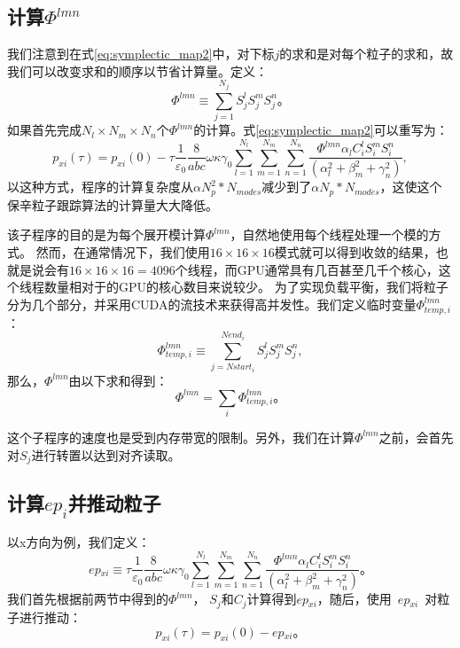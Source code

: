 \subsection{计算$\Phi^{lmn}$}\label{section:phi}
我们注意到在式\eqref{eq:symplectic_map2}中，对下标$j$的求和是对每个粒子的求和，故我们可以改变求和的顺序以节省计算量。定义：
\begin{equation}
\Phi^{lmn}\equiv \sum\limits_{j=1}^{{{N}_{j}}}{S_{j}^{l}S_{j}^{m}S_{j}^{n}}\text{。}
\end{equation}
如果首先完成${{N}_{l}}\times{{N}_{m}}\times{{N}_{n}}$个$\Phi^{lmn}$的计算。式\eqref{eq:symplectic_map2}可以重写为：
\begin{equation}\label{eq:symplectic_map3}
{{p}_{xi}}(\tau )={{p}_{xi}}(0)-\tau \frac{1}{{{\varepsilon }_{0}}}\frac{8}{abc}\omega \kappa {{\gamma }_{0}}\sum\limits_{l=1}^{{{N}_{l}}}{\sum\limits_{m=1}^{{{N}_{m}}}{\sum\limits_{n=1}^{{{N}_{n}}}{\frac{\Phi^{lmn}{{\alpha }_{l}}C_{i}^{l}S_{i}^{m}S_{i}^{n}}{(\alpha _{l}^{2}+\beta _{m}^{2}+\gamma _{n}^{2})}}}},
\end{equation}
以这种方式，程序的计算复杂度从$\alpha N_p^2*N_{modes}$减少到了$\alpha  N_p*N_{modes}$，这使这个保辛粒子跟踪算法的计算量大大降低。

该子程序的目的是为每个展开模计算$\Phi^{lmn}$，自然地使用每个线程处理一个模的方式。
然而，在通常情况下，我们使用$16\times 16\times 16$模式就可以得到收敛的结果，也就是说会有$16\times 16\times 16 = 4096$个线程，而GPU通常具有几百甚至几千个核心，这个线程数量相对于的GPU的核心数目来说较少。
为了实现负载平衡，我们将粒子分为几个部分，并采用CUDA的流技术来获得高并发性。我们定义临时变量$\Phi^{lmn}_{temp,i}$：
\begin{equation}
\Phi^{lmn}_{temp,i}\equiv \sum\limits_{j=Nstar{{t}_{i}}}^{Nen{{d}_{i}}}{S_{j}^{l}S_{j}^{m}S_{j}^{n}},
\end{equation}
那么，$\Phi^{lmn}$由以下求和得到：
\begin{equation}
\Phi^{lmn}=\sum\limits_{i}{\Phi^{lmn}_{temp,i}} \text{。}
\end{equation}

这个子程序的速度也是受到内存带宽的限制。另外，我们在计算$\Phi^{lmn}$之前，会首先对$S_{j}$进行转置以达到对齐读取。

\subsection{计算$ep_i$并推动粒子}
以x方向为例，我们定义：
\begin{equation}
ep{_{xi}}\equiv \tau \frac{1}{{{\varepsilon }_{0}}}\frac{8}{abc}\omega \kappa {{\gamma }_{0}}\sum\limits_{l=1}^{{{N}_{l}}}{\sum\limits_{m=1}^{{{N}_{m}}}{\sum\limits_{n=1}^{{{N}_{n}}}{\frac{\Phi^{lmn}{{\alpha }_{l}}C_{i}^{l}S_{i}^{m}S_{i}^{n}}{(\alpha _{l}^{2}+\beta _{m}^{2}+\gamma _{n}^{2})}}}}\text{。}
\end{equation}
我们首先根据前两节中得到的$\Phi^{lmn}$， $S_{j}^{{}}$和$C_{j}^{{}}$计算得到$ep{_{xi}}$，随后，使用~$ep{_{xi}}$~对粒子进行推动：
\begin{equation}\label{eq:symplectic_map4}
{{p}_{xi}}(\tau )={{p}_{xi}}(0)-ep{_{xi}}\text{。}
\end{equation}

